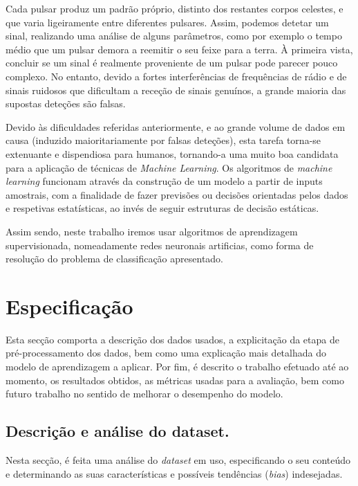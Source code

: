 \documentclass[]{article}
\begin{document}
    Cada pulsar produz um padrão próprio, distinto dos restantes corpos celestes, e que varia ligeiramente entre diferentes pulsares. Assim, podemos detetar um sinal, realizando uma análise de alguns parâmetros, como por exemplo o tempo médio que um pulsar demora a reemitir o seu feixe para a terra. À primeira vista, concluir se um sinal é realmente proveniente de um pulsar pode parecer pouco complexo. No entanto, devido a fortes interferências de frequências de rádio e de sinais ruidosos que dificultam a receção de sinais genuínos, a grande maioria das supostas deteções são falsas.
    
    Devido às dificuldades referidas anteriormente, e ao grande volume de dados em causa (induzido maioritariamente por falsas deteções), esta tarefa torna-se extenuante e dispendiosa para humanos, tornando-a uma muito boa candidata para a aplicação de técnicas de \textit{Machine Learning}.
    Os algoritmos de \textit{machine learning} funcionam através da construção de um modelo a partir de inputs amostrais, com a finalidade de fazer previsões ou decisões orientadas pelos dados e respetivas estatísticas, ao invés de seguir estruturas de decisão estáticas.
    
    Assim sendo, neste trabalho iremos usar algoritmos de aprendizagem supervisionada, nomeadamente redes neuronais artificias, como forma de resolução do problema de classificação apresentado.\\



\section{Especificação}
\label{sec:descricao}
	Esta secção comporta a descrição dos dados usados, a explicitação da etapa de pré-processamento dos dados, bem como uma explicação mais detalhada do modelo de aprendizagem a aplicar. Por fim, é descrito o trabalho efetuado até ao momento, os resultados obtidos, as métricas usadas para a avaliação, bem como futuro trabalho no sentido de melhorar o desempenho do modelo.
    
\subsection{Descrição e análise do dataset.}
\label{sec:dataset}
	Nesta secção, é feita uma análise do \textit{dataset} em uso, especificando o seu conteúdo e determinando as suas características e possíveis tendências (\textit{bias}) indesejadas.
    
\end{document}
